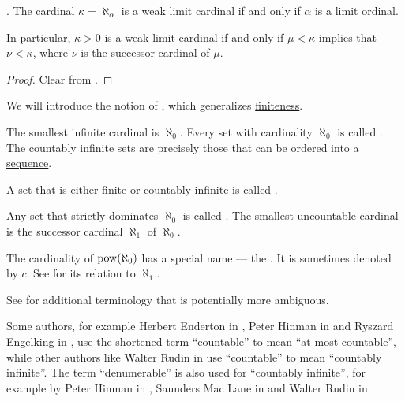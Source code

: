 \begin{corollary}\label{thm:weak_limit_cardinal_equivalences}.
  The cardinal \( \kappa = \aleph_\alpha \) is a weak limit cardinal if and only if \( \alpha \) is a limit ordinal.

  In particular, \( \kappa > 0 \) is a weak limit cardinal if and only if \( \mu < \kappa \) implies that \( \nu < \kappa \), where \( \nu \) is the successor cardinal of \( \mu \).
\end{corollary}
\begin{proof}
  Clear from .
\end{proof}

\begin{definition}\label{def:set_countability}
  We will introduce the notion of , which generalizes \hyperref[def:set_finiteness]{finiteness}.

  \begin{thmenum}
     The smallest infinite cardinal is \hyperref[def:aleph_hierarchy]{\( \aleph_0 \)}. Every set with cardinality \( \aleph_0 \) is called . The countably infinite sets are precisely those that can be ordered into a \hyperref[def:sequence]{sequence}.

     A set that is either finite or countably infinite is called .

     Any set that \hyperref[def:equinumerosity]{strictly dominates} \( \aleph_0 \) is called . The smallest uncountable cardinal is the successor cardinal \( \aleph_1 \) of \( \aleph_0 \).

     The cardinality of \( \operatorname{pow}(\aleph_0) \) has a special name --- the . It is sometimes denoted by \( c \). See  for its relation to \( \aleph_1 \).
  \end{thmenum}

  See  for additional terminology that is potentially more ambiguous.
\end{definition}

\begin{remark}\label{rem:countability_etymology}
  Some authors, for example Herbert Enderton in \cite[159]{Enderton1977Sets}, Peter Hinman in \cite[def. 6.2.32(v)]{Hinman2005} and Ryszard Engelking in \cite[4]{Engelking1989}, use the shortened term \enquote{countable} to mean \enquote{at most countable}, while other authors like Walter Rudin in \cite[def. 2.4(c)]{Rudin1976Principles} use \enquote{countable} to mean \enquote{countably infinite}. The term \enquote{denumerable} is also used for \enquote{countably infinite}, for example by Peter Hinman in \cite[def. 6.2.32(iv)]{Hinman2005}, Saunders Mac Lane in \cite[123]{MacLane1998} and Walter Rudin in \cite[def. 2.4]{Rudin1976Principles}.
\end{remark}

